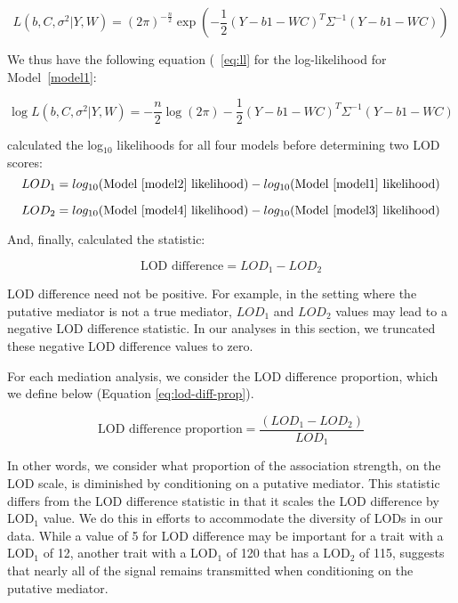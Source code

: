 \documentclass[oneside]{book}
\begin{document}
\begin{equation}
    L(b, C, \sigma^2| Y, W) = (2\pi)^{- \frac{n}{2}}\exp{ \left(- \frac{1}{2}(Y - b1 - WC)^T\Sigma^{-1}(Y - b1 - WC)\right)}
\end{equation}

We thus have the following equation (~\ref{eq:ll} for the log-likelihood for Model~\ref{model1}:

\begin{equation}
    \log L(b, C, \sigma^2 | Y, W) = - \frac{n}{2}\log (2\pi) - \frac{1}{2} (Y - b1 - WC)^T\Sigma^{-1}(Y - b1 - WC)\label{eq:ll}
\end{equation}


\citet{chick2016defining} calculated the log$_{10}$ likelihoods for all four models before determining two LOD scores:
\begin{equation}
LOD_1 = log_{10}(\text{Model~\ref{model2} likelihood}) - log_{10}(\text{Model~\ref{model1} likelihood})\label{eq:lod1}
\end{equation}

\begin{equation}
LOD_2 = log_{10}(\text{Model~\ref{model4} likelihood}) - log_{10}(\text{Model~\ref{model3} likelihood})\label{eq:lod2}
\end{equation}

And, finally, \citet{chick2016defining} calculated the statistic:

\begin{equation}
\text{LOD difference} = LOD_1 - LOD_2\label{eq:lod-diff}
\end{equation}

LOD difference need not be positive. For example, in the setting where the putative mediator is not a true mediator, $LOD_1$ and $LOD_2$ values may lead to a negative LOD difference statistic. In our analyses in this section, we truncated these negative LOD difference values to zero.

For each mediation analysis, we consider the LOD difference proportion, which we define below (Equation \ref{eq:lod-diff-prop}).

\begin{equation}
\text{LOD difference proportion} = \frac{(LOD_1 - LOD_2)}{LOD_1}
\label{eq:lod-diff-prop}
\end{equation}

In other words, we consider what proportion of the association strength, on the LOD scale, is diminished by conditioning on a putative mediator. This statistic differs from the LOD difference statistic in that it scales the LOD difference by LOD$_1$ value. We do this in efforts to accommodate the diversity of LODs in our data. While a value of 5 for LOD difference may be important for a trait with a LOD$_1$ of 12, another trait with a LOD$_1$ of 120 that has a LOD$_2$ of 115, suggests that nearly all of the signal remains transmitted when conditioning on the putative mediator.
\end{document}
